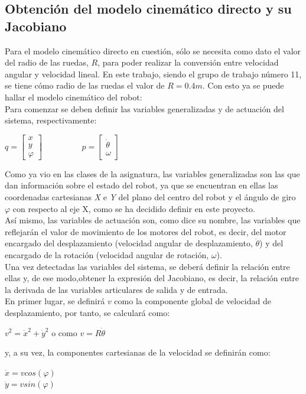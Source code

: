 \documentclass[a4paper,twoside]{article}
\begin{document}
\subsection{Obtención del modelo cinemático directo y su Jacobiano}
Para el modelo cinemático directo en cuestión, sólo se necesita como dato el valor del radio de las ruedas, $R$, para poder realizar la conversión entre velocidad angular y velocidad lineal. En este trabajo, siendo el grupo de trabajo número 11, se tiene cómo radio de las ruedas el valor de $R = 0.4 m$. Con esto ya se puede hallar el modelo cinemático del robot:\\

	Para comenzar se deben definir las variables generalizadas y de actuación del sistema, respectivamente:
	\begin{center}
		$
		q=
		\begin{bmatrix}
		x\\
		y\\
		\varphi
		\end{bmatrix}
		$$
		\hspace{2cm}
		$$
		p=
		\begin{bmatrix}
		\dot{\theta} \\
		\omega
		\end{bmatrix}
		$
\end{center}

Como ya vio en las clases de la asignatura, las variables generalizadas son las que dan información sobre el estado del robot, ya que se encuentran en ellas las coordenadas cartesianas \textit{X} e \textit{Y} del plano del centro del robot y el ángulo de giro $\varphi$ con respecto al eje X, como se ha decidido definir en este proyecto.\\
Así mismo, las variables de actuación son, como dice su nombre, las variables que reflejarán el valor de movimiento de los motores del robot, es decir, del motor encargado del desplazamiento (velocidad angular de desplazamiento, $\dot{\theta}$) y del encargado de la rotación (velocidad angular de rotación, $\omega$).\\

Una vez detectadas las variables del sistema, se deberá definir la relación entre ellas y, de ese modo,obtener la expresión del Jacobiano, es decir, la relación entre la derivada de las variables articulares de salida y de entrada.\\
En primer lugar, se definirá $v$ como la componente global de velocidad de desplazamiento, por tanto, se calculará como:
\begin{center}
	$v^2=\dot{x}^2+\dot{y}^2$ o como $v=R \dot{\theta}$
	\end{center}
	y, a su vez, la componentes cartesianas de la velocidad se definirán como:
	\begin{center}
	$\dot{x}=v cos(\varphi)$\\
	$\dot{y}=v sin(\varphi)$
	\end{center}
\end{document}
